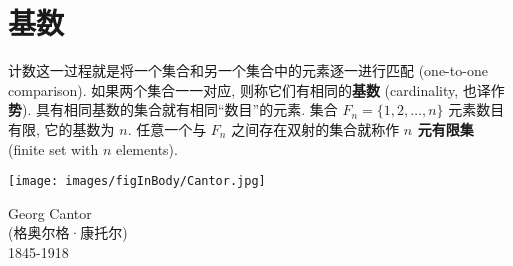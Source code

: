 \documentclass[lang=cn,zihao=-4,twoside,fontset=none]{textbook}
\begin{document}
\newpage
\section{基数}

计数这一过程就是将一个集合和另一个集合中的元素逐一进行匹配 (one-to-one comparison). 如果两个集合一一对应, 则称它们有相同的\textbf{基数} (cardinality, 也译作\textbf{势}). 具有相同基数的集合就有相同“数目”的元素. 集合 $F_n=\{1,2,\dots,n\}$ 元素数目有限, 它的基数为 $n$. 任意一个与 $F_n$ 之间存在双射的集合就称作 \textbf{$n$ 元有限集} (finite set with $n$ elements).

\begin{marginfigure}
    \centering
    \texttt{[image: images/figInBody/Cantor.jpg]}
    \caption*{Georg Cantor\\ (格奥尔格·康托尔)\\ 1845-1918}
\end{marginfigure}
\end{document}
